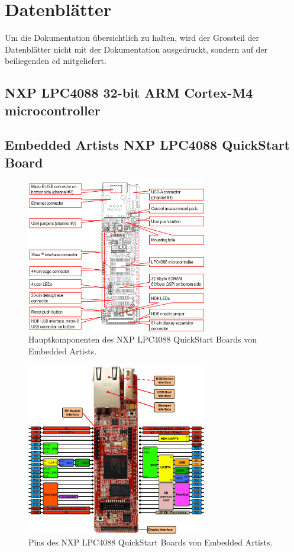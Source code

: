 \section{Datenblätter}\label{app.datasheets}
Um die Dokumentation übersichtlich zu halten, wird der Grossteil der Datenblätter nicht mit der Dokumentation ausgedruckt, sondern auf der beiliegenden \gls{cd} mitgeliefert.


\subsection{NXP LPC4088 32-bit ARM Cortex-M4 microcontroller}



\subsection{Embedded Artists NXP LPC4088 QuickStart Board}

\begin{figure}[H]
	\centering		\includegraphics[width=0.7\textwidth]{images/datasheets/lpc4088_qsb_key_components_reva.png}
	\caption{Hauptkomponenten des NXP LPC4088 QuickStart Boards von Embedded Artists.}
	\label{fig.NXP_LPC4088_QSB_comps}
\end{figure}

\begin{figure}[H]
	\centering		\includegraphics[width=0.7\textwidth]{images/datasheets/LPC4088_QSB_pinning_revA_800x769.png}
	\caption{Pins des NXP LPC4088 QuickStart Boards von Embedded Artists.}
	\label{fig.NXP_LPC4088_QSB_pinout}
\end{figure}

